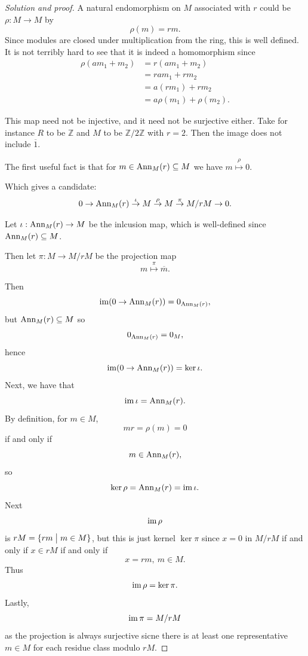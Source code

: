 \documentclass[11pt]{article}
\begin{document}
\begin{proof}[Solution and proof]
    A natural endomorphism on $M$ associated 
    with $r$ could be $\rho : M \to M$ by 
    \[
        \rho(m) = rm. 
    \] 
    Since modules are closed under multiplication 
    from the ring, this is well defined. 
    It is not terribly hard to see that it is 
    indeed a homomorphism since 
    \begin{align*}
        \rho(am_1 + m_2) 
        &= r(am_1 + m_2) \\ 
        &= ram_1 + rm_2 \\ 
        &= a(rm_1) + rm_2 \\ 
        &= a\rho(m_1) + \rho(m_2). 
    \end{align*}

    This map need not be injective, and 
    it need not be surjective either. 
    Take for instance $R$ to be $\mathbb Z$ and 
    $M$ to be $\mathbb Z/2\mathbb Z$ with $r = 2$. 
    Then the image does not include $\overline 1$. 
    
    The first useful fact is that for 
    $m \in \operatorname{Ann}_M(r) \subseteq M$ we have 
    $m \overset\rho\mapsto 0$. 

    Which gives a candidate:
    \[
        0 \to \operatorname{Ann}_M(r) \overset\iota\to M 
        \overset\rho\to M \overset\pi\to M/rM \to 0. 
    \]

    Let $\iota : \operatorname{Ann}_M(r) \to M$ be the inlcusion map, 
    which is well-defined since 
    $\operatorname{Ann}_M(r) \subseteq M$. 

    Then let $\pi : M \to M/rM$ be the projection map 
    \[
        m \overset\pi\mapsto \overline m. 
    \]

    Then 
    \[
        \operatorname{im}(0\to\operatorname{Ann}_M(r)) = 0_{\operatorname{Ann}_M(r)}, 
    \]
    but $\operatorname{Ann}_M(r) \subseteq M$ so 
    \[
        0_{\operatorname{Ann}_M(r)} = 0_M, 
    \]
    hence 
    \[
        \operatorname{im}(0\to\operatorname{Ann}_M(r)) = \ker\iota. 
    \]
    Next, we have that 
    \[
        \operatorname{im}\iota = \operatorname{Ann}_M(r). 
    \]
    By definition, for $m \in M$, 
    \[
        mr = \rho(m) = 0 
    \]
    if and only if 
    \[
        m \in \operatorname{Ann}_M(r), 
    \]
    so 
    \[
        \ker\rho = \operatorname{Ann}_M(r) = \operatorname{im}\iota. 
    \]
    Next 
    \[
        \operatorname{im}\rho  
    \]
    is $rM = \{rm \bigm| m \in M\}$, 
    but this is just kernel $\ker \pi$ 
    since $x = 0$ in $M/rM$ if and only if 
    $x \in rM$ if and only if 
    \[
        x = rm, \ m \in M. 
    \]     
    Thus 
    \[
        \operatorname{im}\rho = \ker\pi. 
    \]
    Lastly, 
    \[
        \operatorname{im}\pi = M/rM 
    \]
    as the projection is always surjective sicne 
    there is at least one representative 
    $m \in M$ for each residue class modulo $rM$. 
    

\end{proof}
\end{document}
